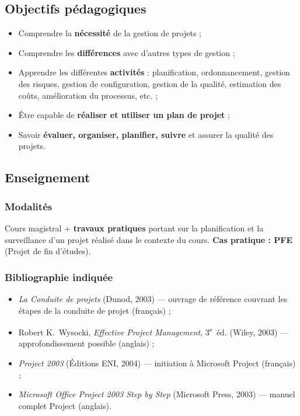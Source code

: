 \documentclass[11pt,a4paper]{article}
\begin{document}
\subsection{Objectifs pédagogiques}
\begin{itemize}[nosep]
  \item Comprendre la \textbf{nécessité} de la gestion de projets ;
  \item Comprendre les \textbf{différences} avec d'autres types de gestion ;
  \item Apprendre les différentes \textbf{activités} : planification, ordonnancement, gestion des risques, gestion de configuration, gestion de la qualité, estimation des coûts, amélioration du processus, etc. ;
  \item Être capable de \textbf{réaliser et utiliser un plan de projet} ;
  \item Savoir \textbf{évaluer, organiser, planifier, suivre} et assurer la qualité des projets.
\end{itemize}

\subsection{Enseignement}
\subsubsection{Modalités}
Cours magistral + \textbf{travaux pratiques} portant sur la planification et la surveillance d'un projet réalisé dans le contexte du cours. \textbf{Cas pratique : PFE} (Projet de fin d'études).

\subsubsection{Bibliographie indiquée}
\begin{itemize}[nosep]
  \item \emph{La Conduite de projets} (Dunod, 2003) — ouvrage de référence couvrant les étapes de la conduite de projet (français) ;
  \item Robert K.\ Wysocki, \emph{Effective Project Management}, 3\textsuperscript{e}~éd. (Wiley, 2003) — approfondissement possible (anglais) ;
  \item \emph{Project 2003} (Éditions ENI, 2004) — initiation à Microsoft Project (français) ;
  \item \emph{Microsoft Office Project 2003 Step by Step} (Microsoft Press, 2003) — manuel complet Project (anglais).
\end{itemize}
\end{document}
